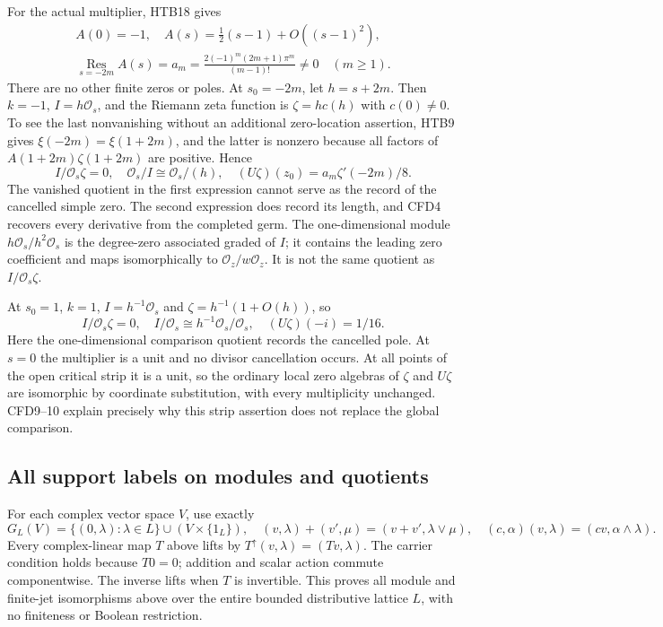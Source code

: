 For the actual multiplier, HTB18 gives
\begin{equation}\tag{CFD8}
\begin{gathered}
 A(0)=-1,\quad A(s)=\tfrac12(s-1)+O((s-1)^2),\\
 \operatorname*{Res}_{s=-2m}A(s)
    =a_m=\frac{2(-1)^m(2m+1)\pi^m}{(m-1)!}\ne0
       \quad(m\ge1).
\end{gathered}
\end{equation}
There are no other finite zeros or poles. At $s_0=-2m$, let
$h=s+2m$. Then $k=-1$, $I=h\mathcal O_s$, and the Riemann zeta
function is $\zeta=h c(h)$ with $c(0)\ne0$. To see the last
nonvanishing without an additional zero-location assertion, HTB9
gives $\xi(-2m)=\xi(1+2m)$, and the latter is nonzero because all
factors of $A(1+2m)\zeta(1+2m)$ are positive. Hence
\begin{equation}\tag{CFD9}
 I/\mathcal O_s\zeta=0,\quad
 \mathcal O_s/I\cong\mathcal O_s/(h),\quad
 (U\zeta)(z_0)=a_m\zeta'(-2m)/8.
\end{equation}
The vanished quotient in the first expression cannot serve as the
record of the cancelled simple zero. The second expression does
record its length, and CFD4 recovers every derivative from the
completed germ. The one-dimensional module $h\mathcal O_s/h^2
\mathcal O_s$ is the degree-zero associated graded of $I$; it
contains the leading zero coefficient and maps isomorphically to
$\mathcal O_z/w\mathcal O_z$. It is not the same quotient as
$I/\mathcal O_s\zeta$.

At $s_0=1$, $k=1$, $I=h^{-1}\mathcal O_s$ and
$\zeta=h^{-1}(1+O(h))$, so
\begin{equation}\tag{CFD10}
 I/\mathcal O_s\zeta=0,\quad
 I/\mathcal O_s\cong h^{-1}\mathcal O_s/\mathcal O_s,
 \quad (U\zeta)(-i)=1/16.
\end{equation}
Here the one-dimensional comparison quotient records the cancelled
pole. At $s=0$ the multiplier is a unit and no divisor cancellation
occurs. At all points of the open critical strip it is a unit,
so the ordinary local zero algebras of $\zeta$ and $U\zeta$ are
isomorphic by coordinate substitution, with every multiplicity
unchanged. CFD9--10 explain precisely why this strip assertion
does not replace the global comparison.

\subsection{All support labels on modules and quotients}

For each complex vector space $V$, use exactly
\begin{equation}\tag{CFD11}
 G_L(V)=\{(0,\lambda):\lambda\in L\}\cup(V\times\{1_L\}),
 \quad (v,\lambda)+(v',\mu)=(v+v',\lambda\vee\mu),
 \quad(c,\alpha)(v,\lambda)=(cv,\alpha\wedge\lambda).
\end{equation}
Every complex-linear map $T$ above lifts by
$T^\uparrow(v,\lambda)=(Tv,\lambda)$. The carrier condition holds
because $T0=0$; addition and scalar action commute componentwise.
The inverse lifts when $T$ is invertible. This proves all module
and finite-jet isomorphisms above over the entire bounded
distributive lattice $L$, with no finiteness or Boolean restriction.

